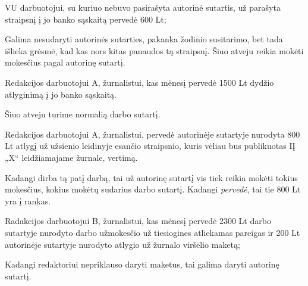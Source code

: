 \begin{tasks}
\begin{task}
    \begin{subtask}
      \begin{condition}
        VU darbuotojui, su kuriuo nebuvo pasirašyta autorinė sutartis,
        už parašyta straipsnį į jo banko sąskaitą pervedė 600 Lt;
      \end{condition}
      \begin{solution}
        Galima nesudaryti autorinės sutarties, pakanka žodinio susitarimo,
        bet tada išlieka grėsmė, kad kas nors kitas panaudos tą
        straipsnį. Šiuo atveju reikia mokėti mokesčius pagal
        autorinę sutartį.


      \end{solution}
    \end{subtask}
    \begin{subtask}
      \begin{condition}
        Redakcijos darbuotojui A, žurnalistui, kas mėnesį pervedė
        1500 Lt dydžio atlyginimą į jo banko sąskaitą.
      \end{condition}
      \begin{solution}
        Šiuo atveju turime normalią darbo sutartį.


      \end{solution}
    \end{subtask}
    \begin{subtask}
      \begin{condition}
        Redakcijos darbuotojui A, žurnalistui, pervedė autorinėje
        sutartyje nurodyta 800 Lt atlygį už užsienio leidinyje
        esančio straipsnio, kuris vėliau bus publikuotas IĮ „X“
        leidžiamajame žurnale, vertimą.
      \end{condition}
      \begin{solution}
        Kadangi dirba tą patį darbą, tai už autorinę sutartį vis tiek
        reikia mokėti tokius mokesčius, kokius mokėtų sudarius
        darbo sutartį. Kadangi \emph{pervedė}, tai tie 800 Lt yra
        į rankas.


      \end{solution}
    \end{subtask}
    \begin{subtask}
      \begin{condition}
        Radakcijos darbuotojui B, žurnalistui, kas mėnesį pervedė
        2300 Lt darbo sutartyje nurodyto darbo užmokesčio už tiesiogines
        atliekamas pareigas ir 200 Lt autorinėje sutartyje
        nurodyto atlygio už žurnalo viršelio maketą;
      \end{condition}
      \begin{solution}
        Kadangi redaktoriui nepriklauso daryti maketus, tai galima
        daryti autorinę sutartį.


\end{solution}
\end{subtask}
\end{task}
\end{tasks}
